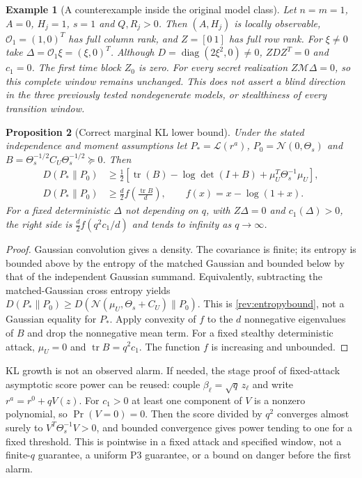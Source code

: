 \documentclass[11pt,a4paper]{article}
\newtheorem{proposition}{Proposition}
\newtheorem{example}[proposition]{Example}
\DeclareMathOperator{\tr}{tr}
\begin{document}
\begin{example}[A counterexample inside the original model class]
\label{rev:degenerate}
Let $n=m=1$, $A=0$, $H_j=1$, $s=1$ and $Q,R_j>0$.
Then $(A,H_j)$ is locally observable,
$\mathcal O_1=(1,0)^T$ has full column rank, and $Z=[0\ 1]$ has full
row rank. For $\xi\ne0$ take $\Delta=\mathcal O_1\xi=(\xi,0)^T$.
Although $D=\operatorname{diag}(2\xi^2,0)\ne0$, $ZDZ^T=0$ and
$c_1=0$. The first time block $Z_0$ is zero. For every secret realization
$Z\mathcal M\Delta=0$, so this complete window remains unchanged.
This does not assert a blind direction in the three previously tested
nondegenerate models, or stealthiness of every transition window.
\end{example}

\begin{proposition}[Correct marginal KL lower bound]
\label{rev:entropy}
Under the stated independence and moment assumptions let
$P_*=\mathcal L(r^a)$, $P_0=\mathcal N(0,\Theta_s)$ and
$B=\Theta_s^{-1/2}C_U\Theta_s^{-1/2}\succeq0$. Then
\begin{align}
 D(P_*\|P_0)&\ge\tfrac12\left[
 \tr(B)-\log\det(I+B)+\mu_U^T\Theta_s^{-1}\mu_U\right],
 \label{rev:entropybound}\\
 D(P_*\|P_0)&\ge\frac d2 f\!\left(\frac{\tr B}{d}\right),
 \qquad f(x)=x-\log(1+x).\label{rev:traceKL}
\end{align}
For a fixed deterministic $\Delta$ not depending on $q$, with
$Z\Delta=0$ and $c_1(\Delta)>0$, the right side is
$\frac d2 f(q^2c_1/d)$ and tends to infinity as $q\to\infty$.
\end{proposition}
\begin{proof}
Gaussian convolution gives a density. The covariance is finite; its entropy
is bounded above by the entropy of the matched Gaussian and bounded below
by that of the independent Gaussian summand. Equivalently, subtracting
the matched-Gaussian cross entropy yields
$D(P_*\|P_0)\ge D(\mathcal N(\mu_U,\Theta_s+C_U)\|P_0)$.
This is \eqref{rev:entropybound}, not a Gaussian equality for $P_*$.
Apply convexity of $f$ to the $d$ nonnegative eigenvalues of $B$ and drop
the nonnegative mean term. For a fixed stealthy deterministic attack,
$\mu_U=0$ and $\tr B=q^2c_1$. The function $f$ is increasing and unbounded.
\end{proof}

KL growth is not an observed alarm. If needed, the stage proof of
fixed-attack asymptotic score power can be reused: couple
$\beta_\ell=\sqrt q\,z_\ell$ and write $r^a=r^0+qV(z)$.
For $c_1>0$ at least one component of $V$ is a nonzero polynomial,
so $\Pr(V=0)=0$. Then the score divided by $q^2$ converges almost surely
to $V^T\Theta_s^{-1}V>0$, and bounded convergence gives power tending
to one for a fixed threshold. This is pointwise in a fixed attack and
specified window, not a finite-$q$ guarantee, a uniform P3 guarantee,
or a bound on danger before the first alarm.
\end{document}
